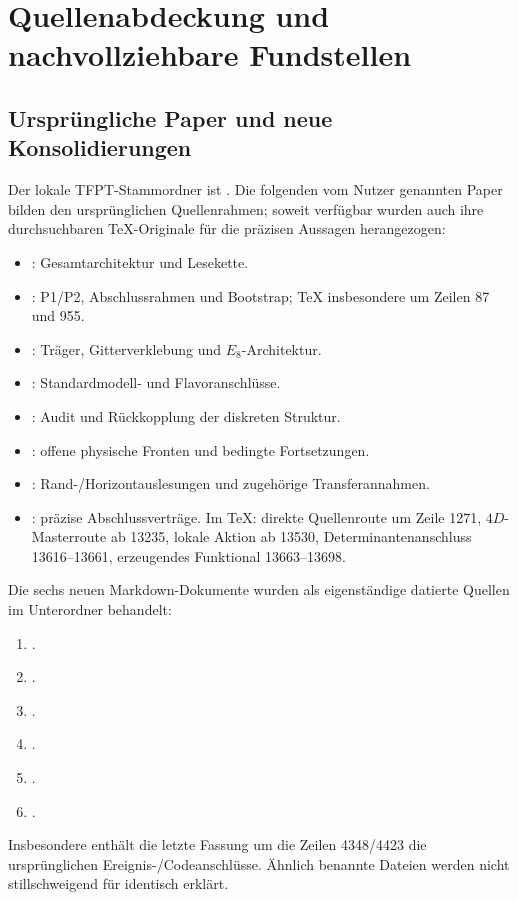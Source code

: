 \section{Quellenabdeckung und nachvollziehbare Fundstellen}\label{app:sources}

\subsection{Ursprüngliche Paper und neue Konsolidierungen}
Der lokale TFPT-Stammordner ist
.
Die folgenden vom Nutzer genannten Paper bilden den ursprünglichen Quellenrahmen; soweit verfügbar wurden auch ihre durchsuchbaren TeX-Originale für die präzisen Aussagen herangezogen:
\begin{itemize}
\item {}: Gesamtarchitektur und Lesekette.
\item {}: P1/P2, Abschlussrahmen und Bootstrap; TeX insbesondere um Zeilen 87 und 955.
\item {}: Träger, Gitterverklebung und $E_8$-Architektur.
\item {}: Standardmodell- und Flavoranschlüsse.
\item {}: Audit und Rückkopplung der diskreten Struktur.
\item {}: offene physische Fronten und bedingte Fortsetzungen.
\item {}: Rand-/Horizontauslesungen und zugehörige Transferannahmen.
\item {}: präzise Abschlussverträge. Im TeX: direkte Quellenroute um Zeile 1271, $4D$-Masterroute ab 13235, lokale Aktion ab 13530, Determinantenanschluss 13616--13661, erzeugendes Funktional 13663--13698.
\end{itemize}

Die sechs neuen Markdown-Dokumente wurden als eigenständige datierte Quellen im Unterordner  behandelt:
\begin{enumerate}
\item {}.
\item {}.
\item {}.
\item {}.
\item {}.
\item {}.
\end{enumerate}
Insbesondere enthält die letzte Fassung um die Zeilen 4348/4423 die ursprünglichen Ereignis-/Codeanschlüsse. Ähnlich benannte Dateien werden nicht stillschweigend für identisch erklärt.

